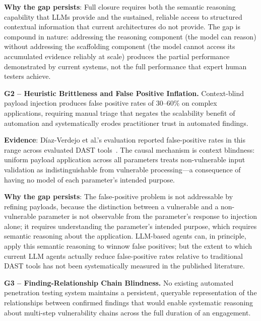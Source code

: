 \documentclass[12pt,a4paper,oneside,openany]{book}
\begin{document}
\textbf{Why the gap persists}: Full closure requires both the semantic reasoning capability that LLMs provide and the sustained, reliable access to structured contextual information that current architectures do not provide. The gap is compound in nature: addressing the reasoning component (the model can reason) without addressing the scaffolding component (the model cannot access its accumulated evidence reliably at scale) produces the partial performance demonstrated by current systems, not the full performance that expert human testers achieve.

\vspace{0.4cm}


\noindent\textbf{G2 -- Heuristic Brittleness and False Positive Inflation.} Context-blind payload injection produces false positive rates of 30--60\% on complex applications, requiring manual triage that negates the scalability benefit of automation and systematically erodes practitioner trust in automated findings.


\textbf{Evidence}: D\'{i}az-Verdejo et al.'s evaluation reported false-positive rates in this range across evaluated DAST tools~\citep{diaz2022evaluation}. The causal mechanism is context blindness: uniform payload application across all parameters treats non-vulnerable input validation as indistinguishable from vulnerable processing---a consequence of having no model of each parameter's intended purpose.

\textbf{Why the gap persists}: The false-positive problem is not addressable by refining payloads, because the distinction between a vulnerable and a non-vulnerable parameter is not observable from the parameter's response to injection alone; it requires understanding the parameter's intended purpose, which requires semantic reasoning about the application. LLM-based agents can, in principle, apply this semantic reasoning to winnow false positives; but the extent to which current LLM agents actually reduce false-positive rates relative to traditional DAST tools has not been systematically measured in the published literature.

\vspace{0.4cm}


\noindent\textbf{G3 -- Finding-Relationship Chain Blindness.} No existing automated penetration testing system maintains a persistent, queryable representation of the relationships between confirmed findings that would enable systematic reasoning about multi-step vulnerability chains across the full duration of an engagement.
\end{document}
